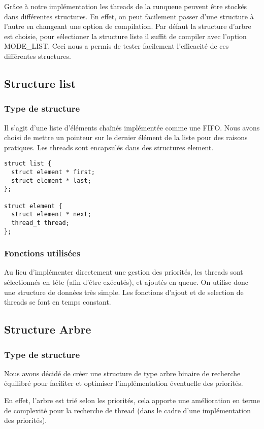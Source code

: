 
Grâce à notre implémentation les threads de la runqueue peuvent être
stockés dans différentes structures. En effet, on peut facilement
passer d'une structure à l'autre en changeant une option de
compilation. Par défaut la structure d'arbre est choisie, pour
sélectioner la structure liste il suffit de compiler avec l'option
MODE\_LIST. Ceci nous a permis de tester facilement l'efficacité de ces
différentes structures.

\subsection{Structure list}
\subsubsection{Type de structure}
Il s'agit d'une liste d'éléments chaînés implémentée comme une
FIFO. Nous avons choisi de mettre un pointeur sur le dernier élément
de la liste pour des raisons pratiques. Les threads sont encapsulés
dans des structures element.
\begin{verbatim}
struct list {
  struct element * first;
  struct element * last;
};

struct element {
  struct element * next;
  thread_t thread;
};

\end{verbatim}


\subsubsection{Fonctions utilisées}
Au lieu d'implémenter directement une gestion des priorités, les
threads sont sélectionnés en tête (afin d'être exécutés), et ajoutés
en queue. On utilise donc une structure de données très simple.  Les
fonctions d'ajout et de selection de threads se font en temps
constant.

\subsection{Structure Arbre}
\subsubsection{Type de structure}
Nous avons décidé de créer une structure de type arbre binaire de
recherche équilibré pour faciliter et optimiser l'implémentation
éventuelle des priorités.

En effet, l'arbre est trié selon les priorités, cela apporte une
amélioration en terme de complexité pour la recherche de thread (dans
le cadre d'une implémentation des priorités).

